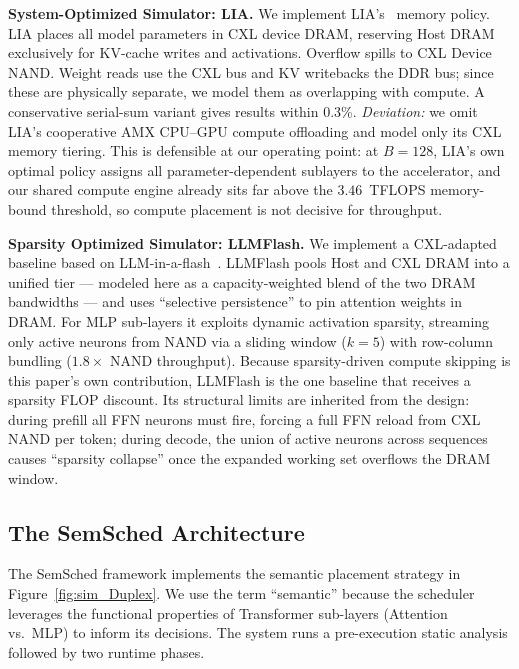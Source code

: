 \documentclass[10pt,conference,letterpaper]{IEEEtran}
\begin{document}
\noindent
\textbf{System-Optimized Simulator: LIA.}
We implement LIA's~\cite{kim2025lia} memory policy. LIA places all model parameters in CXL device DRAM, reserving Host DRAM exclusively for KV-cache writes and activations. Overflow spills to CXL Device NAND. Weight reads use the CXL bus and KV writebacks the DDR bus; since these are physically separate, we model them as overlapping with compute. A conservative serial-sum variant gives results within 0.3\%. \emph{Deviation:} we omit LIA's cooperative AMX CPU--GPU compute offloading and model only its CXL memory tiering. This is defensible at our operating point: at $B{=}128$, LIA's own optimal policy assigns all parameter-dependent sublayers to the accelerator, and our shared compute engine already sits far above the $3.46$~TFLOPS memory-bound threshold, so compute placement is not decisive for throughput.

\noindent\textbf{Sparsity Optimized Simulator: LLMFlash.}
We implement a CXL-adapted baseline based on LLM-in-a-flash~\cite{alizadeh2024llm}. LLMFlash pools Host and CXL DRAM into a unified tier --- modeled here as a capacity-weighted blend of the two DRAM bandwidths --- and uses ``selective persistence'' to pin attention weights in DRAM. For MLP sub-layers it exploits dynamic activation sparsity, streaming only active neurons from NAND via a sliding window ($k{=}5$) with row-column bundling ($1.8\times$ NAND throughput). Because sparsity-driven compute skipping is this paper's own contribution, LLMFlash is the one baseline that receives a sparsity FLOP discount. Its structural limits are inherited from the design: during prefill all FFN neurons must fire, forcing a full FFN reload from CXL NAND per token; during decode, the union of active neurons across sequences causes ``sparsity collapse'' once the expanded working set overflows the DRAM window.

\subsection{The SemSched Architecture}
\label{sec:semantic-duplex}
\noindent
The SemSched framework implements the semantic placement strategy in Figure~\ref{fig:sim_Duplex}. We use the term ``semantic'' because the scheduler leverages the functional properties of Transformer sub-layers (Attention vs.\ MLP) to inform its decisions. The system runs a pre-execution static analysis followed by two runtime phases.
\end{document}
